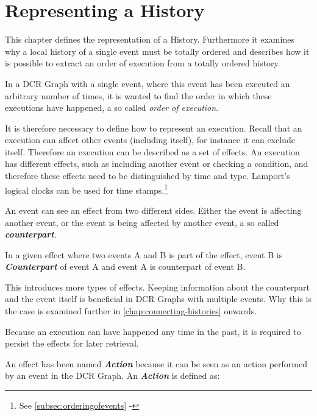 \chapter{Representing a History}\label{chap:representing-a-history}
	This chapter defines the representation of a History. Furthermore it examines why a local history of a single event must be totally ordered and describes how it is possible to extract an order of execution from a totally ordered history.
	
	\newpar	In a DCR Graph with a single event, where this event has been executed an arbitrary number of times, it is wanted to find the order in which these executions have happened, a so called \textit{order of execution}.
	
	\newpar	It is therefore necessary to define how to represent an execution. Recall that an execution can affect other events (including itself), for instance it can exclude itself. Therefore an execution can be described as a set of effects. An execution has different effects, such as including another event or checking a condition, and therefore these effects need to be distinguished by time and type. Lamport's logical clocks can be used for time stamps.\footnote{See \autoref{subsec:orderingofevents} - }
	
	\newpar An event can see an effect from two different sides. Either the event is affecting another event, or the event is being affected by another event, a so called \textit{\textbf{counterpart}}.

	\noindent\hrulefill	
	\begin{definition}
		In a given effect where two events A and B is part of the effect, event B is \textbf{\textit{Counterpart}} of event A and event A is counterpart of event B.
		
		\noindent\hrulefill
	\end{definition}
	
	\newpar This introduces more types of effects. Keeping information about the counterpart and the event itself is beneficial in DCR Graphs with multiple events. Why this is the case is examined further in \autoref{chap:connecting-histories} onwards.
	
	\newpar Because an execution can have happened any time in the past, it is required to persist the effects for later retrieval.
	
	\newpar An effect has been named \textit{\textbf{Action}} because it can be seen as an action performed by an event in the DCR Graph. An \textit{\textbf{Action}} is defined as:
	
